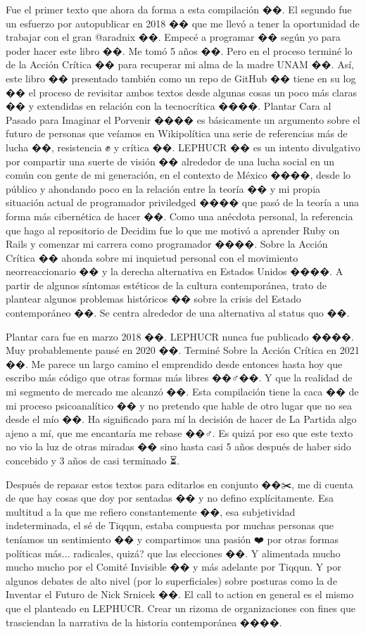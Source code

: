 Fue el primer texto que ahora da forma a esta compilación ��. El segundo fue un esfuerzo por autopublicar en 2018 �� que me llevó a tener la oportunidad de trabajar con el gran @aradnix ��. Empecé a programar �� según yo para poder hacer este libro ��. Me tomó 5 años ��. Pero en el proceso terminé lo de la Acción Crítica �� para recuperar mi alma de la madre UNAM ��.
Así, este libro �� presentado también como un repo de GitHub �� tiene en su log �� el proceso de revisitar ambos textos desde algunas cosas un poco más claras �� y extendidas en relación con la tecnocrítica ��️��.
Plantar Cara al Pasado para Imaginar el Porvenir ���� es básicamente un argumento sobre el futuro de personas que veíamos en Wikipolítica una serie de referencias más de lucha ��, resistencia ✊ y crítica ��.
LEPHUCR �� es un intento divulgativo por compartir una suerte de visión ��️ alrededor de una lucha social en un común con gente de mi generación, en el contexto de México ����, desde lo público y ahondando poco en la relación entre la teoría �� y mi propia situación actual de programador priviledged ���� que pasó de la teoría a una forma más cibernética de hacer ��. Como una anécdota personal, la referencia que hago al repositorio de Decidim fue lo que me motivó a aprender Ruby on Rails y comenzar mi carrera como programador ����.
Sobre la Acción Crítica �� ahonda sobre mi inquietud personal con el movimiento neorreaccionario �� y la derecha alternativa en Estados Unidos ����. A partir de algunos síntomas estéticos de la cultura contemporánea, trato de plantear algunos problemas históricos �� sobre la crisis del Estado contemporáneo ��️. Se centra alrededor de una alternativa al status quo ��.

Plantar cara fue en marzo 2018 ��. LEPHUCR nunca fue publicado ����. Muy probablemente pausé en 2020 ��. Terminé Sobre la Acción Crítica en 2021 ��. Me parece un largo camino el emprendido desde entonces hasta hoy que escribo más código que otras formas más libres ��‍♂️��. Y que la realidad de mi segmento de mercado me alcanzó ��. Esta compilación tiene la caca �� de mi proceso psicoanalítico �� y no pretendo que hable de otro lugar que no sea desde el mío ��️. Ha significado para mí la decisión de hacer de La Partida algo ajeno a mí, que me encantaría me rebase ��‍♂️. Es quizá por eso que este texto no vio la luz de otras miradas �� sino hasta casi 5 años después de haber sido concebido y 3 años de casi terminado ⏳.

Después de repasar estos textos para editarlos en conjunto ��✂️, me di cuenta de que hay cosas que doy por sentadas �� y no defino explícitamente. Esa multitud a la que me refiero constantemente ��, esa subjetividad indeterminada, el sé de Tiqqun, estaba compuesta por muchas personas que teníamos un sentimiento �� y compartimos una pasión ❤️ por otras formas políticas más... radicales, quizá? que las elecciones ��️. Y alimentada mucho mucho mucho por el Comité Invisible �� y más adelante por Tiqqun. Y por algunos debates de alto nivel (por lo superficiales) sobre posturas como la de Inventar el Futuro de Nick Srnicek ��. El call to action en general es el mismo que el planteado en LEPHUCR. Crear un rizoma de organizaciones con fines que trasciendan la narrativa de la historia contemporánea ����.

